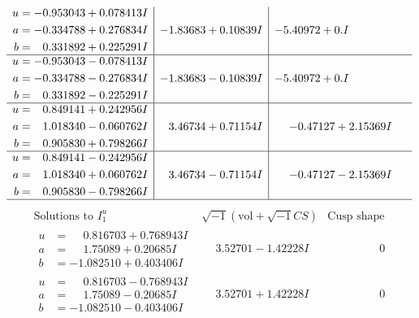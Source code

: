 \documentclass[1p]{elsarticle_modified}
\theoremstyle{definition}
\newcommand{\I}{\sqrt{-1}}
\begin{document}
$$\begin{array}{c|c|c}
\begin{aligned}
u &= -0.953043 + 0.078413 I \\
a &= -0.334788 + 0.276834 I \\
b &= \phantom{-}0.331892 + 0.225291 I\end{aligned}
 & -1.83683 + 0.10839 I & -5.40972 + 0. I\phantom{ +0.000000I} \\ \hline\begin{aligned}
u &= -0.953043 - 0.078413 I \\
a &= -0.334788 - 0.276834 I \\
b &= \phantom{-}0.331892 - 0.225291 I\end{aligned}
 & -1.83683 - 0.10839 I & -5.40972 + 0. I\phantom{ +0.000000I} \\ \hline\begin{aligned}
u &= \phantom{-}0.849141 + 0.242956 I \\
a &= \phantom{-}1.018340 - 0.060762 I \\
b &= \phantom{-}0.905830 + 0.798266 I\end{aligned}
 & \phantom{-}3.46734 + 0.71154 I & -0.47127 + 2.15369 I \\ \hline\begin{aligned}
u &= \phantom{-}0.849141 - 0.242956 I \\
a &= \phantom{-}1.018340 + 0.060762 I \\
b &= \phantom{-}0.905830 - 0.798266 I\end{aligned}
 & \phantom{-}3.46734 - 0.71154 I & -0.47127 - 2.15369 I\\
 \hline 
 \end{array}$$\newpage$$\begin{array}{c|c|c}  
\text{Solutions to }I^u_{1}& \I (\text{vol} + \sqrt{-1}CS) & \text{Cusp shape}\\
 \hline 
\begin{aligned}
u &= \phantom{-}0.816703 + 0.768943 I \\
a &= \phantom{-}1.75089 + 0.20685 I \\
b &= -1.082510 + 0.403406 I\end{aligned}
 & \phantom{-}3.52701 - 1.42228 I & \phantom{-0.000000 } 0 \\ \hline\begin{aligned}
u &= \phantom{-}0.816703 - 0.768943 I \\
a &= \phantom{-}1.75089 - 0.20685 I \\
b &= -1.082510 - 0.403406 I\end{aligned}
 & \phantom{-}3.52701 + 1.42228 I & \phantom{-0.000000 } 0 \\ \hline\begin{aligned}

\end{aligned}
\end{array}$$
\end{document}
